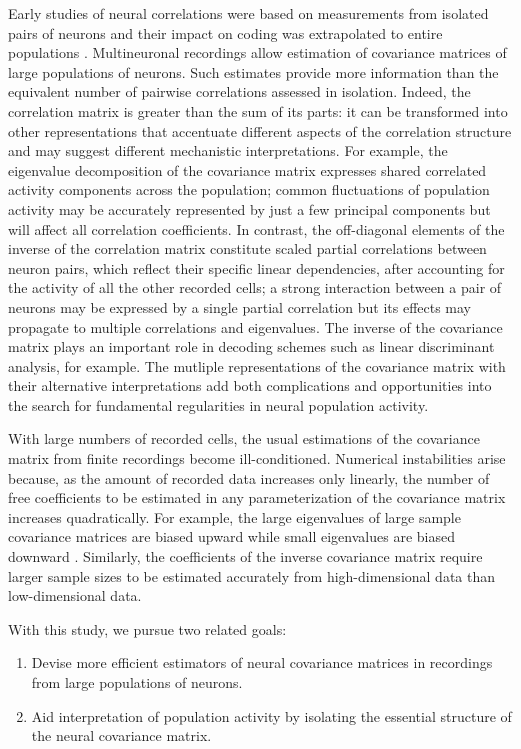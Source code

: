 Early studies of neural correlations were based on measurements from isolated pairs of neurons and their impact on coding was extrapolated to entire populations \citep{Shadlen:1998,Zohary:1994}.  Multineuronal recordings allow estimation of covariance matrices of large populations of neurons.  Such estimates provide more information than the equivalent number of pairwise correlations assessed in isolation. Indeed, the correlation matrix is greater than the sum of its parts: it can be transformed into other representations that accentuate different aspects of the correlation structure and may suggest different mechanistic interpretations. For example, the eigenvalue decomposition of the covariance matrix expresses shared correlated activity components across the population; common fluctuations of population activity may be accurately represented by just a few principal components but will affect all correlation coefficients. In contrast, the off-diagonal elements of the inverse of the correlation matrix constitute scaled partial correlations between neuron pairs, which reflect their specific linear dependencies, after accounting for the activity of all the other recorded cells; a strong interaction between a pair of neurons may be expressed by a single partial correlation but its effects may propagate to multiple correlations and eigenvalues.   The inverse of the covariance matrix plays an important role in decoding schemes such as linear discriminant analysis, for example.  The mutliple  representations of the covariance matrix with their alternative interpretations add both complications and opportunities into the search for fundamental regularities in neural population activity. 

With large numbers of recorded cells, the usual estimations of the covariance matrix from finite recordings become ill-conditioned. Numerical instabilities arise because, as the amount of recorded data increases only linearly, the number of free coefficients to be estimated in any parameterization of the covariance matrix increases quadratically. 
For example, the large eigenvalues of large sample covariance matrices are biased upward while small eigenvalues are biased downward \citep{Hayes:1981}. Similarly, the coefficients of the inverse covariance matrix require larger sample sizes to be estimated accurately from high-dimensional data than low-dimensional data.

With this study, we pursue two related goals: 
\begin{enumerate}[\qquad A.\;\;]
	\item Devise more efficient estimators of neural covariance matrices in recordings from large populations of neurons.
	\item Aid interpretation of population activity  by isolating the essential structure of the neural covariance matrix.
\end{enumerate}

